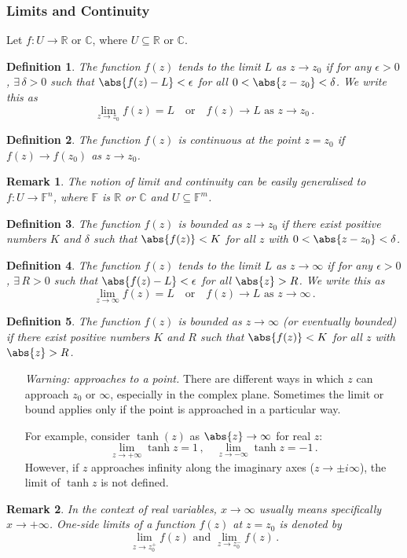 \documentclass{article}
\theoremstyle{plain}\theoremheaderfont{\normalfont\itshape}\theorembodyfont{\rmfamily}\theoremseparator{.}\newtheorem*{rem}{Remark}\newtheorem*{ex}{Example}\newtheorem*{proof}{Proof}\newtheorem*{altp}{Alternative proof}
\theoremstyle{plain}\theoremheaderfont{\normalfont\bfseries}\theorembodyfont{\rmfamily}\theoremseparator{.}\newtheorem{thm}{Theorem}[section]\newtheorem{lem}[thm]{Lemma}\newtheorem{prop}[thm]{Proposition}\newtheorem*{cor}{Corollary}\newtheorem{defn}[thm]{Definition}\newtheorem{clm}[thm]{Claim}\newtheorem{clminproof}{Claim}
\theoremstyle{break}\theoremheaderfont{\normalfont\itshape}\theorembodyfont{\rmfamily}\theoremseparator{.\medskip}\newtheorem*{proofskip}{Proof}\newtheorem*{exs}{Examples}\newtheorem*{rems}{Remarks}
\theoremstyle{break}\theoremheaderfont{\normalfont\bfseries}\theorembodyfont{\rmfamily}\theoremseparator{.\medskip}\newtheorem{lemskip}[thm]{Lemma}\newtheorem{defnskip}[thm]{Definition}\newtheorem{propskip}[thm]{Proposition}\newtheorem{thmskip}[thm]{Theorem}
\numberwithin{equation}{section}
\begin{document}
	\subsubsection{Limits and Continuity}
	Let \(f:U\to\mathbb{R}\) or \(\mathbb{C}\), where \(U\subseteq \mathbb{R}\) or \(\mathbb{C}\).
	\begin{defn}
		The function \(f(z)\) tends to the \textit{limit} \(L\) as \(z\to z_0\) if for any \(\epsilon>0\), \(\exists\,\delta>0\) such that \(\abs{f(z)-L}<\epsilon\) for all \(0<\abs{z-z_0}<\delta\).	We write this as
		\[\lim_{z\to z_0}f(z)=L\quad\text{or}\quad f(z)\to L\text{ as }z\to z_0\,.\]
	\end{defn}
	\begin{defn}
		The function \(f(z)\) is \textit{continuous} at the point \(z=z_0\) if \(f(z)\to f(z_0)\) as \(z\to z_0\).
	\end{defn}
	\begin{rem}
		The notion of limit and continuity can be easily generalised to \(f:U\to\mathbb{F}^n\), where \(\mathbb{F}\) is \(\mathbb{R}\) or \(\mathbb{C}\) and \(U\subseteq\mathbb{F}^m\).
	\end{rem}
	\begin{defn}
		The function \(f(z)\) is \textit{bounded} as \(z\to z_0\) if there exist positive numbers \(K\) and \(\delta\) such that \(\abs{f(z)}<K\) for all \(z\) with \(0<\abs{z-z_0}<\delta\).
	\end{defn}
	\begin{defn}
		The function \(f(z)\) tends to the \textit{limit} \(L\) as \(z\to \infty\) if for any \(\epsilon>0\), \(\exists\,R>0\) such that \(\abs{f(z)-L}<\epsilon\) for all \(\abs{z}>R\). We write this as
		\[\lim_{z\to\infty}f(z)=L\quad\text{or}\quad f(z)\to L\text{ as }z\to\infty\,.\]
	\end{defn}
	\begin{defn}
		The function \(f(z)\) is \textit{bounded} as \(z\to\infty\) (or \textit{eventually bounded}) if there exist positive numbers \(K\) and \(R\) such that \(\abs{f(z)}<K\) for all \(z\) with \(\abs{z}>R\).
	\end{defn}
	\begin{itemize}[topsep=0pt,leftmargin=30pt,itemindent=115pt,parsep=1em]
		\item[\textit{Warning: approaches to a point.}] There are different ways in which \(z\) can approach \(z_0\) or \(\infty\), especially in the complex plane. Sometimes the limit or bound applies only if the point is approached in a particular way.
		
		For example, consider \(\tanh(z)\) as \(\abs{z}\to\infty\) for real \(z\):
		\[\lim_{z\to +\infty}\tanh z=1\,,\quad\lim_{z\to -\infty}\tanh z=-1\,.\]
		However, if \(z\) approaches infinity along the imaginary axes (\(z\to\pm i\infty\)), the limit of \(\tanh z\) is not defined.
	\end{itemize}
	\begin{rem}
		In the context of real variables, \(x\to\infty\) usually means specifically \(x\to+\infty\). One-side limits of a function \(f(z)\) at \(z=z_0\) is denoted by
		\[\lim_{z\to z_0^+}f(z)\text{ and }\lim_{z\to z_0^-}f(z)\,.\]
	\end{rem}
\end{document}
